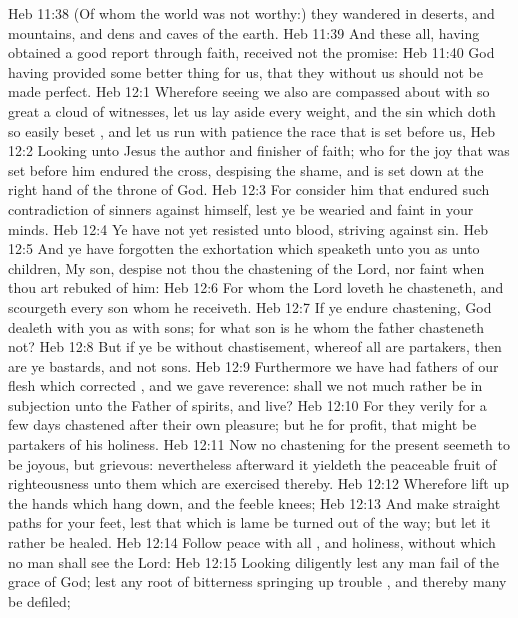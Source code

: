 \vs Heb 11:38 (Of whom the world was not worthy:) they wandered in deserts, and  mountains, and  dens and caves of the earth.
\vs Heb 11:39 And these all, having obtained a good report through faith, received not the promise:
\vs Heb 11:40 God having provided some better thing for us, that they without us should not be made perfect.
\vs Heb 12:1 Wherefore seeing we also are compassed about with so great a cloud of witnesses, let us lay aside every weight, and the sin which doth so easily beset , and let us run with patience the race that is set before us,
\vs Heb 12:2 Looking unto Jesus the author and finisher of  faith; who for the joy that was set before him endured the cross, despising the shame, and is set down at the right hand of the throne of God.
\vs Heb 12:3 For consider him that endured such contradiction of sinners against himself, lest ye be wearied and faint in your minds.
\vs Heb 12:4 Ye have not yet resisted unto blood, striving against sin.
\vs Heb 12:5 And ye have forgotten the exhortation which speaketh unto you as unto children, My son, despise not thou the chastening of the Lord, nor faint when thou art rebuked of him:
\vs Heb 12:6 For whom the Lord loveth he chasteneth, and scourgeth every son whom he receiveth.
\vs Heb 12:7 If ye endure chastening, God dealeth with you as with sons; for what son is he whom the father chasteneth not?
\vs Heb 12:8 But if ye be without chastisement, whereof all are partakers, then are ye bastards, and not sons.
\vs Heb 12:9 Furthermore we have had fathers of our flesh which corrected , and we gave  reverence: shall we not much rather be in subjection unto the Father of spirits, and live?
\vs Heb 12:10 For they verily for a few days chastened  after their own pleasure; but he for  profit, that  might be partakers of his holiness.
\vs Heb 12:11 Now no chastening for the present seemeth to be joyous, but grievous: nevertheless afterward it yieldeth the peaceable fruit of righteousness unto them which are exercised thereby.
\vs Heb 12:12 Wherefore lift up the hands which hang down, and the feeble knees;
\vs Heb 12:13 And make straight paths for your feet, lest that which is lame be turned out of the way; but let it rather be healed.
\vs Heb 12:14 Follow peace with all , and holiness, without which no man shall see the Lord:
\vs Heb 12:15 Looking diligently lest any man fail of the grace of God; lest any root of bitterness springing up trouble , and thereby many be defiled;
